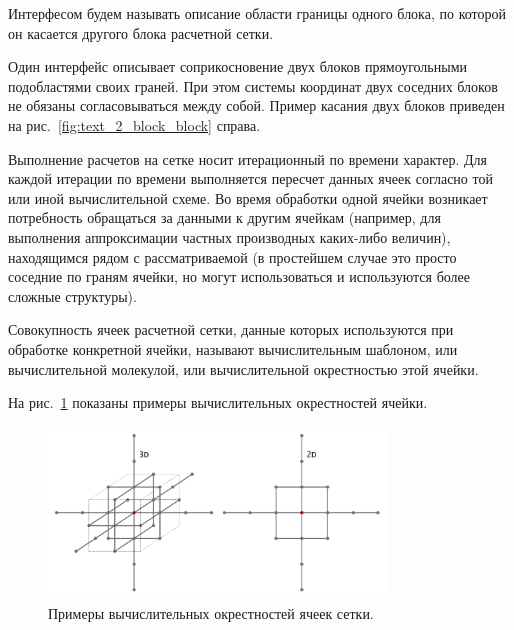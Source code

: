 \begin{definition}
Интерфесом\label{term:block_interface} будем называть описание области границы одного блока, по которой он касается другого блока расчетной сетки.
\end{definition}

Один интерфейс описывает соприкосновение двух блоков прямоугольными подобластями своих граней.
При этом системы координат двух соседних блоков не обязаны согласовываться между собой.
Пример касания двух блоков приведен на рис.~\ref{fig:text_2_block_block} справа.

Выполнение расчетов на сетке носит итерационный по времени характер.
Для каждой итерации по времени выполняется пересчет данных ячеек согласно той или иной вычислительной схеме.
Во время обработки одной ячейки возникает потребность обращаться за данными к другим ячейкам (например, для выполнения аппроксимации частных производных каких-либо величин), находящимся рядом с рассматриваемой (в простейшем случае это просто соседние по граням ячейки, но могут использоваться и используются более сложные структуры).

\begin{definition}
Совокупность ячеек расчетной сетки, данные которых используются при обработке конкретной ячейки, называют вычислительным шаблоном, или вычислительной молекулой, или вычислительной окрестностью этой ячейки\label{term:cell_calc_template}.
\end{definition}

На рис.~\ref{fig:text_2_block_cell_delta} показаны примеры вычислительных окрестностей ячейки.

\begin{figure}[ht]
\centering
\includegraphics[width=0.8\textwidth]{./pics/text_2_block/3-cell-delta.pdf}
\singlespacing
{}\caption{Примеры вычислительных окрестностей ячеек сетки.}
\label{fig:text_2_block_cell_delta}
\end{figure}


